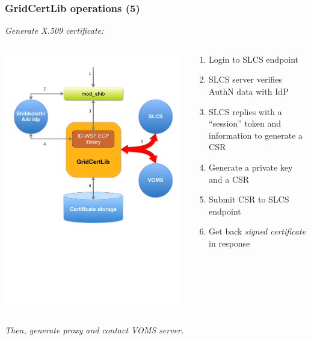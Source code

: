 \documentclass{beamer}
\newcommand{\+}{\vspace{1em}}
\begin{document}
\begin{frame}
  \frametitle{GridCertLib operations (5)}
  \emph{Generate X.509 certificate:}
  \begin{columns}
    \begin{column}{0.4\textwidth}
      \includegraphics[width=\linewidth,viewport=0 300 600 650]{architecture5}
    \end{column}
    \begin{column}{0.6\textwidth}
      \begin{enumerate}
      \item Login to SLCS endpoint
      \item SLCS server verifies AuthN data with IdP
      \item SLCS replies with a ``session'' token and information
        to generate a CSR
      \item Generate a private key and a CSR
      \item Submit CSR to SLCS endpoint
      \item Get back \emph{signed certificate} in response
      \end{enumerate}
    \end{column}
  \end{columns}

  \emph{Then, generate proxy and contact VOMS server.}
\end{frame}
\end{document}
